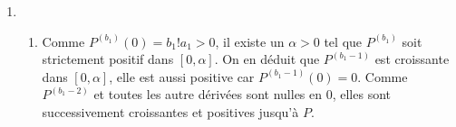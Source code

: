 \begin{enumerate}
   changements de signe dans $a_1,a_2,\cdots$. On en d{\'e}duit
   \[V(P)=V(Q)+1\]
   D'apr{\`e}s la r{\`e}gle de Descartes {\`a} l'ordre $n-1$ : $n_+(Q)\leq V(Q)=V(P)-1$.\newline
   D'apr{\`e}s la question 3. on a :   $n_+(Q)\geq n_+(P)-1$.\newline
   On en d{\'e}duit $n_+(P)-1\leq V(P) -1$ c'est {\`a}
   dire $n_+(P)\leq V(P)$.
   \item
\begin{enumerate}
  \item Comme $P^{(b_1)}(0)=b_1!a_1>0$, il existe un $\alpha>0$
  tel que $P^{(b_1)}$ soit strictement positif dans
  $[0,\alpha]$. On en d{\'e}duit que $P^{(b_1-1)}$ est croissante dans
  $[0,\alpha]$, elle est aussi positive car $P^{(b_1-1)}(0)=0$.
  Comme $P^{(b_1-2)}$ et toutes les autre d{\'e}riv{\'e}es sont nulles en
  0, elles sont successivement croissantes et positives jusqu'{\`a}
  $P$.


\end{enumerate}
\end{enumerate}
